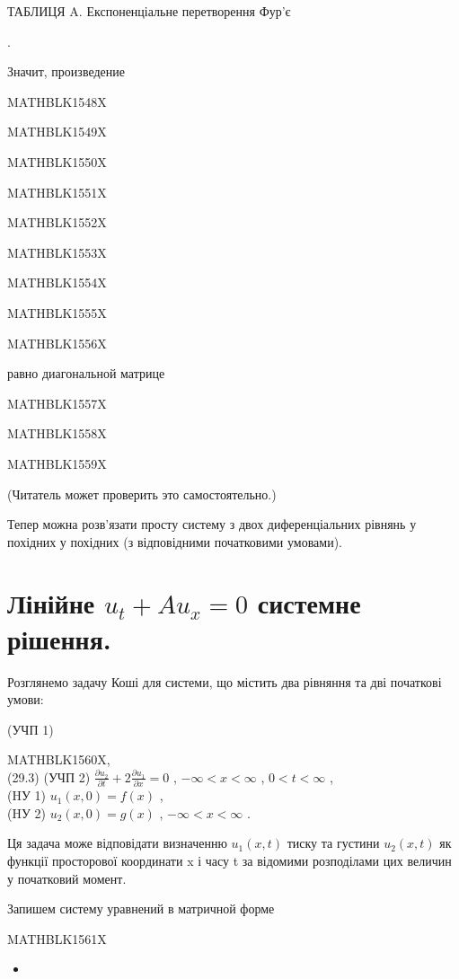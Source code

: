 \documentclass[
  ukrainian,
]{article}
\providecommand{\tightlist}{%
  \setlength{\itemsep}{0pt}\setlength{\parskip}{0pt}}
\begin{document}
ТАБЛИЦЯ A. Експоненціальне перетворення Фур'є

.

Значит, произведение

MATHBLK1548X

MATHBLK1549X

MATHBLK1550X

MATHBLK1551X

MATHBLK1552X

MATHBLK1553X

MATHBLK1554X

MATHBLK1555X

MATHBLK1556X

равно диагональной матрице

MATHBLK1557X

MATHBLK1558X

MATHBLK1559X

(Читатель может проверить это самостоятельно.)

Тепер можна розв'язати просту систему з двох диференціальних рівнянь у
похідних у похідних (з відповідними початковими умовами).

\section{\texorpdfstring{Лінійне \(u_t + Au_x = 0\) системне
рішення.}{Лінійне u\_t + Au\_x = 0 системне рішення.}}\label{ux43bux456ux43dux456ux439ux43dux435-u_t-au_x-0-ux441ux438ux441ux442ux435ux43cux43dux435-ux440ux456ux448ux435ux43dux43dux44f.}

Розглянемо задачу Коші для системи, що містить два рівняння та дві
початкові умови:

(УЧП 1)

MATHBLK1560X,\\
(29.3) (УЧП 2)
\(\frac{\partial u_2}{\partial t} + 2 \frac{\partial u_1}{\partial x} = 0\)
, \(-\infty < x < \infty\) , \(0 < t < \infty\) ,\\
(HУ 1) \(u_1(x, 0) = f(x)\) ,\\
(HУ 2) \(u_2(x, 0) = g(x)\) , \(-\infty < x < \infty\) .

Ця задача може відповідати визначенню \(u_1(x, t)\) тиску та густини
\(u_2(x, t)\) як функції просторової координати x і часу t за відомими
розподілами цих величин у початковий момент.

Запишем систему уравнений в матричной форме

MATHBLK1561X

\begin{itemize}
\tightlist
\item
\end{itemize}
\end{document}
